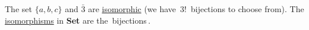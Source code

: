 The set $\{a,b,c\}$ and $\bar{3}$ are \href{doc/1 math/Seven Sketches in Compositionality/Chapter 3: Databases/2 Categories/5 Isomorphisms in a category/1 Isomorphism}{isomorphic} (we have \,$3!$\, bijections to choose from). The \href{doc/1 math/Seven Sketches in Compositionality/Chapter 3: Databases/2 Categories/5 Isomorphisms in a category/1 Isomorphism}{isomorphisms} in \textbf{Set} are the \,bijections\,.
